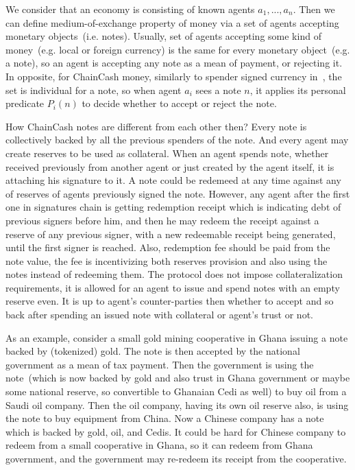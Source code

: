 \documentclass{llncs}   %
\newcommand{\cc}{ChainCash}
\begin{document}
We consider that an economy is consisting of known agents $a_1, ..., a_n$. Then we can define medium-of-exchange property of money via a set of agents accepting monetary objects~(i.e. notes). Usually, set of agents accepting some kind of money~(e.g. local or foreign currency) is the same for every monetary object~(e.g. a note), so an agent is accepting any note as a mean of payment, or rejecting it. In opposite, for \cc{} money, similarly to spender signed currency in~\cite{saito2003peer}, the set is individual for a note, so when agent $a_i$ sees a note $n$, it applies its personal predicate $P_i(n)$ to decide whether to accept or reject the note.

How \cc{} notes are different from each other then? Every note is collectively backed by all the previous spenders of the note. And every agent may create reserves to be used as collateral. When an agent spends note, whether received previously from another agent or just created by the agent itself, it is attaching his signature to it. A note could be redemeed at any time against any of reserves of agents previously signed the note. However, any agent after the first one in signatures chain is getting redemption receipt which is indicating debt of previous signers before him, and then he may redeem the receipt against a reserve of any previous signer, with a new redeemable receipt being generated, until the first signer is reached. Also, redemption fee should be paid from the note value, the fee is incentivizing both reserves provision and also using the notes instead of redeeming them. The protocol does not impose collateralization requirements, it is allowed for an agent to issue and spend notes with an empty reserve even. It is up to agent's counter-parties then whether to accept and so back after spending an issued note with collateral or agent's trust or not.

As an example, consider a small gold mining cooperative in Ghana issuing a note backed by (tokenized) gold. The note is then accepted by the national government as a mean of tax payment. Then the government is using the note~(which is now backed by gold and also trust in Ghana government or maybe some national reserve, so convertible to Ghanaian Cedi as well) to buy oil from a Saudi oil company. Then the oil company, having its own oil reserve also, is using the note to buy equipment from China. Now a Chinese company has a note which is backed by gold, oil, and Cedis. It could be hard for Chinese company to redeem from a small cooperative in Ghana, so it can redeem from Ghana government, and the government may re-redeem its receipt from the cooperative.
\end{document}
